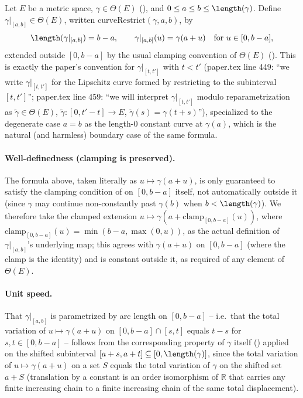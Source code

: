 \begin{definition}
  Let $E$ be a metric space, $\gamma \in \Theta(E)$ (), and $0 \le a \le b \le \length(\gamma)$.
  Define $\gamma|_{[a,b]} \in \Theta(E)$, written $\mathrm{curveRestrict}(\gamma,a,b)$, by
  \[
    \length(\gamma|_{[a,b]}) = b - a
    , \qquad
    \gamma|_{[a,b]}(u) = \gamma(a+u) \quad \text{for } u \in [0,b-a]
    ,
  \]
  extended outside $[0,b-a]$ by the usual clamping convention of $\Theta(E)$ ().
  This is exactly the paper's convention for $\gamma|_{[t,t']}$ with $t<t'$ (paper.tex line 449:
  ``we write $\gamma|_{[t,t']}$ for the Lipschitz curve formed by restricting to the subinterval
  $[t,t']$''; paper.tex line 459: ``we will interpret $\gamma|_{[t,t']}$ modulo reparametrization
  as $\tilde\gamma \in \Theta(E)$, $\tilde\gamma\colon[0,t'-t]\to E$, $\tilde\gamma(s)=\gamma(t+s)$''),
  specialized to the degenerate case $a=b$ as the length-$0$ constant curve at $\gamma(a)$, which is
  the natural (and harmless) boundary case of the same formula.

  \paragraph{Well-definedness (clamping is preserved).} The formula above, taken literally as
  $u \mapsto \gamma(a+u)$, is only guaranteed to satisfy the clamping condition of 
  on $[0,b-a]$ itself, not automatically outside it (since $\gamma$ may continue non-constantly past
  $\gamma(b)$ when $b < \length(\gamma)$). We therefore take the clamped extension
  $u \mapsto \gamma(a + \mathrm{clamp}_{[0,b-a]}(u))$, where $\mathrm{clamp}_{[0,b-a]}(u) =
  \min(b-a,\max(0,u))$, as the actual definition of $\gamma|_{[a,b]}$'s underlying map; this agrees
  with $\gamma(a+u)$ on $[0,b-a]$ (where the clamp is the identity) and is constant outside it, as
  required of any element of $\Theta(E)$.

  \paragraph{Unit speed.} That $\gamma|_{[a,b]}$ is parametrized by arc length on $[0,b-a]$ --
  i.e.\ that the total variation of $u \mapsto \gamma(a+u)$ on $[0,b-a] \cap [s,t]$ equals $t-s$ for
  $s,t \in [0,b-a]$ -- follows from the corresponding property of $\gamma$ itself
  () applied on the shifted subinterval $[a+s,a+t] \subseteq [0,\length(\gamma)]$,
  since the total variation of $u \mapsto \gamma(a+u)$ on a set $S$ equals the total variation of
  $\gamma$ on the shifted set $a+S$ (translation by a constant is an order isomorphism of
  $\mathbb{R}$ that carries any finite increasing chain to a finite increasing chain of the same
  total displacement).
\end{definition}
